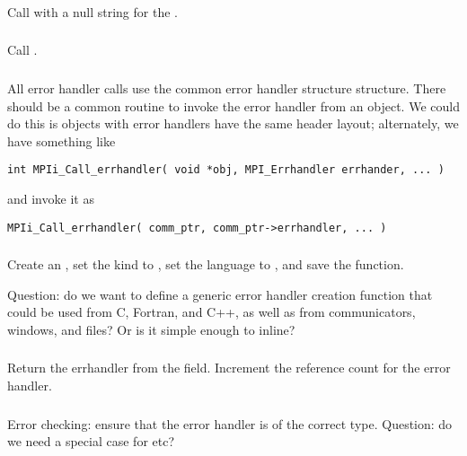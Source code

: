 \documentclass{article}
\begin{document}
\subsubsection{}
Call  with a null string for the
. 

\subsubsection{}
Call .

\subsubsection{}
All error handler calls use the common error handler structure
 structure.  There should be a common
routine to invoke the error handler from an object.  We could do this
is objects with error handlers have the same header layout;
alternately, we have something like
\begin{verbatim}
int MPIi_Call_errhandler( void *obj, MPI_Errhandler errhander, ... )
\end{verbatim}
and invoke it as
\begin{verbatim}
MPIi_Call_errhandler( comm_ptr, comm_ptr->errhandler, ... )
\end{verbatim}

\subsubsection{}
Create an , set the kind to
, set the language to , and
save the function.  

Question: do we want to define a generic error handler
creation function that could be used from C, Fortran, and C++, as well as from
communicators, windows, and files?  Or is it simple enough to inline?

\subsubsection{}
Return the errhandler from the  field.  Increment the 
reference count for the error handler.

\subsubsection{}
Error checking: ensure that the error handler is of the correct type.  
Question: do we need a special case for  etc?
\end{document}
